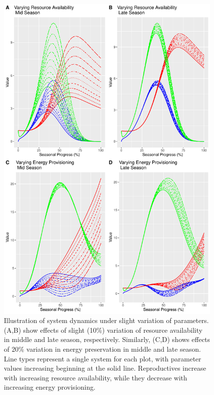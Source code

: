 \documentclass[12pt]{report}
\begin{document}
\begin{figure}[t]
\centering
\includegraphics{FinalProject-VarPlots}
\caption{Illustration of system dynamics under slight variation of parameters. (A,B) show effects of slight (10\%) variation of resource availability in middle and late season, respectively. Similarly, (C,D) shows effects of 20\% variation in energy preservation in middle and late season. Line types represent a single system for each plot, with parameter values increasing beginning at the solid line. Reproductives increase with increasing resource availability, while they decrease with increasing energy provisioning.}
\end{figure}


\newpage



\end{document}
